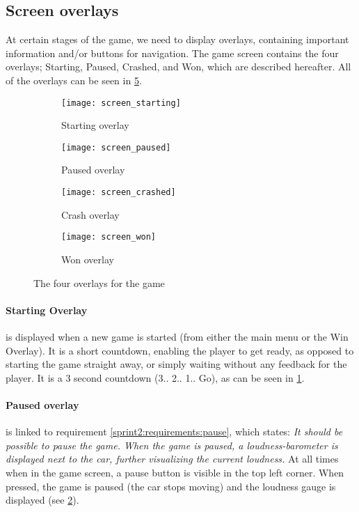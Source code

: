 \subsection{Screen overlays}
At certain stages of the game, we need to display overlays, containing important information and/or buttons for navigation.
The game screen contains the four overlays; Starting, Paused, Crashed, and Won, which are described hereafter.
All of the overlays can be seen in \cref{sprint2:overlays:fig}.

\begin{figure}[h]
	\centering
    \begin{subfigure}[b]{0.49\textwidth}
            \texttt{[image: screen\_starting]}
            \caption{Starting overlay}
            \label{sprint2:overlays:fig:starting}
    \end{subfigure}
    \begin{subfigure}[b]{0.49\textwidth}
            \texttt{[image: screen\_paused]}
            \caption{Paused overlay}
            \label{sprint2:overlays:fig:paused}
    \end{subfigure}
    \begin{subfigure}[b]{0.49\textwidth}
            \texttt{[image: screen\_crashed]}
            \caption{Crash overlay}
            \label{sprint2:overlays:fig:crashed}
    \end{subfigure}
    \begin{subfigure}[b]{0.49\textwidth}
            \texttt{[image: screen\_won]}
            \caption{Won overlay}
            \label{sprint2:overlays:fig:won}
    \end{subfigure}
    \caption{The four overlays for the game}
    \label{sprint2:overlays:fig}
\end{figure}

\paragraph{Starting Overlay} is displayed when a new game is started (from either the main menu or the Win Overlay).
It is a short countdown, enabling the player to get ready, as opposed to starting the game straight away, or simply waiting without any feedback for the player.
It is a 3 second countdown (3.. 2.. 1.. Go), as can be seen in \cref{sprint2:overlays:fig:starting}.

\paragraph{Paused overlay} is linked to requirement \ref{sprint2:requirements:pause}, which states: \textit{It should be possible to pause the game. When the game is paused, a loudness-barometer is displayed next to the car, further visualizing the current loudness.}
At all times when in the game screen, a pause button is visible in the top left corner.
When pressed, the game is paused (the car stops moving) and the loudness gauge is displayed (see \cref{sprint2:overlays:fig:paused}).

